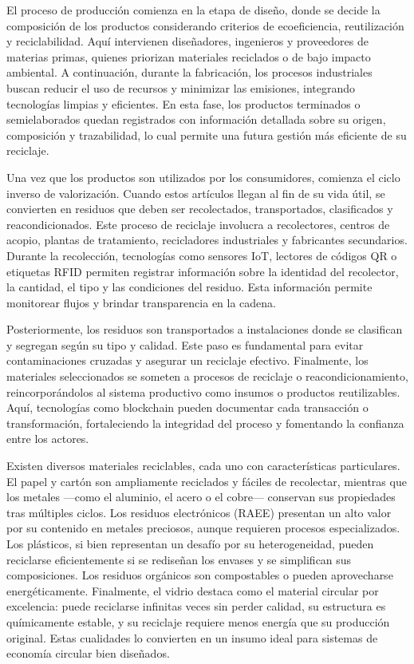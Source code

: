 El proceso de producción comienza en la etapa de diseño, donde se decide la composición de los productos considerando criterios de ecoeficiencia, reutilización y reciclabilidad. Aquí intervienen diseñadores, ingenieros y proveedores de materias primas, quienes priorizan materiales reciclados o de bajo impacto ambiental. A continuación, durante la fabricación, los procesos industriales buscan reducir el uso de recursos y minimizar las emisiones, integrando tecnologías limpias y eficientes. En esta fase, los productos terminados o semielaborados quedan registrados con información detallada sobre su origen, composición y trazabilidad, lo cual permite una futura gestión más eficiente de su reciclaje.

Una vez que los productos son utilizados por los consumidores, comienza el ciclo inverso de valorización. Cuando estos artículos llegan al fin de su vida útil, se convierten en residuos que deben ser recolectados, transportados, clasificados y reacondicionados. Este proceso de reciclaje involucra a recolectores, centros de acopio, plantas de tratamiento, recicladores industriales y fabricantes secundarios. Durante la recolección, tecnologías como sensores IoT, lectores de códigos QR o etiquetas RFID permiten registrar información sobre la identidad del recolector, la cantidad, el tipo y las condiciones del residuo. Esta información permite monitorear flujos y brindar transparencia en la cadena.

Posteriormente, los residuos son transportados a instalaciones donde se clasifican y segregan según su tipo y calidad. Este paso es fundamental para evitar contaminaciones cruzadas y asegurar un reciclaje efectivo. Finalmente, los materiales seleccionados se someten a procesos de reciclaje o reacondicionamiento, reincorporándolos al sistema productivo como insumos o productos reutilizables. Aquí, tecnologías como blockchain pueden documentar cada transacción o transformación, fortaleciendo la integridad del proceso y fomentando la confianza entre los actores.

Existen diversos materiales reciclables, cada uno con características particulares. El papel y cartón son ampliamente reciclados y fáciles de recolectar, mientras que los metales —como el aluminio, el acero o el cobre— conservan sus propiedades tras múltiples ciclos. Los residuos electrónicos (RAEE) presentan un alto valor por su contenido en metales preciosos, aunque requieren procesos especializados. Los plásticos, si bien representan un desafío por su heterogeneidad, pueden reciclarse eficientemente si se rediseñan los envases y se simplifican sus composiciones. Los residuos orgánicos son compostables o pueden aprovecharse energéticamente. Finalmente, el vidrio destaca como el material circular por excelencia: puede reciclarse infinitas veces sin perder calidad, su estructura es químicamente estable, y su reciclaje requiere menos energía que su producción original. Estas cualidades lo convierten en un insumo ideal para sistemas de economía circular bien diseñados.

